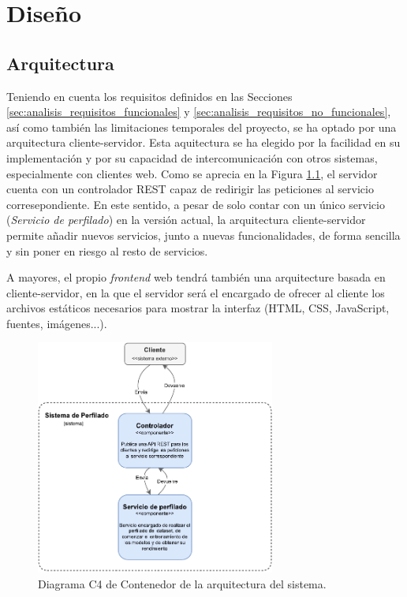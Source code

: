 \chapter{Diseño}
\label{chap:diseño}

\section{Arquitectura}
\label{sec:diseño_arquitectura}

Teniendo en cuenta los requisitos definidos en las Secciones \ref{sec:analisis_requisitos_funcionales} y \ref{sec:analisis_requisitos_no_funcionales},
así como también las limitaciones temporales del proyecto, se ha optado por una arquitectura cliente-servidor. Esta aquitectura se ha elegido
por la facilidad en su implementación y por su capacidad de intercomunicación con otros sistemas, especialmente con clientes web. Como
se aprecia en la Figura \ref{fig:arquitectura_contenedor}, el servidor cuenta con un controlador REST capaz de redirigir las peticiones al servicio
corresepondiente. En este sentido, a pesar de solo contar con un único servicio (\textit{Servicio de perfilado}) en la versión actual,
la arquitectura cliente-servidor permite añadir nuevos servicios, junto a nuevas funcionalidades, de forma sencilla y sin poner en riesgo al resto de servicios.

\bigskip
A mayores, el propio \textit{frontend} web tendrá también una arquitecture basada en cliente-servidor, en la que el servidor será el encargado
de ofrecer al cliente los archivos estáticos necesarios para mostrar la interfaz (HTML, CSS, JavaScript, fuentes, imágenes...).

\bigskip
\begin{figure}[H]
	\centering
	\includegraphics[width=0.7\textwidth]{diagramas/arquitectura_contenedor.pdf}
	\caption{Diagrama C4 de Contenedor de la arquitectura del sistema.}
	\label{fig:arquitectura_contenedor}
\end{figure}

